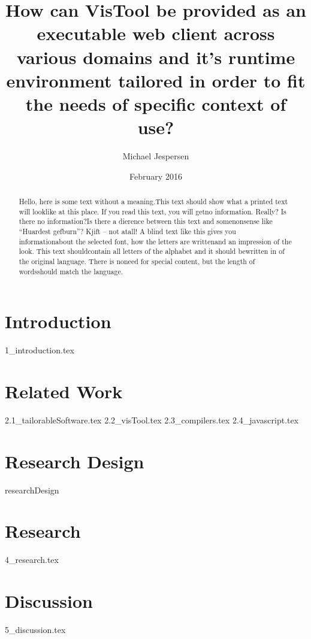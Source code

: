 \documentclass[12pt, a4paper]{article}
\title{How can VisTool be provided as an executable web client across various domains and it's runtime environment tailored in order to fit the needs of specific context of use?}
\author{Michael Jespersen}
\date{February 2016}
\begin{document}
\maketitle

\clearpage

\begin{abstract}
Hello, here is some text without a meaning.This text should show what a printed text will looklike at this place. If you read this text, you will getno information.  Really?  Is there no information?Is  there  a  dierence  between  this  text  and  somenonsense like “Huardest gefburn”?  Kjift – not atall!   A  blind  text  like  this  gives  you  informationabout the selected font, how the letters are writtenand  an  impression  of  the  look.   This  text  shouldcontain all letters of the alphabet and it should bewritten  in  of  the  original  language.   There  is  noneed for special content,  but the length of wordsshould match the language.
\end{abstract}

\clearpage

\tableofcontents

\clearpage

\section{Introduction}
{1_introduction.tex}

\section{Related Work}
{2.1_tailorableSoftware.tex}
{2.2_visTool.tex}
{2.3_compilers.tex}
{2.4_javascript.tex}

\section{Research Design}
{researchDesign}

\section{Research}

{4_research.tex}


\section{Discussion}
{5_discussion.tex}
\end{document}
